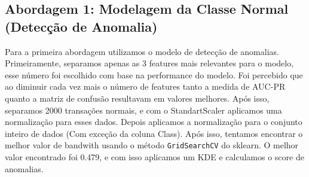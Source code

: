 \documentclass[conference]{IEEEtran}
\begin{document}
\subsection{Abordagem 1: Modelagem da Classe Normal (Detecção de Anomalia)}
\label{subsec:abordagem1}
  Para a primeira abordagem utilizamos o modelo de detecção de anomalias. Primeiramente, separamos apenas as 3 features mais relevantes para o modelo, esse número foi escolhido com base na performance do modelo. Foi percebido que ao diminuir cada vez mais o número de features tanto a medida de AUC-PR quanto a matriz de confusão resultavam em valores melhores. Após isso, separamos 2000 transações normais, e com o StandartScaler aplicamos uma normalização para esses dados. Depois aplicamos a normalização para o conjunto inteiro de dados (Com exceção da coluna Class). Após isso, tentamos encontrar o melhor valor de bandwith usando o método \texttt{GridSearchCV} do sklearn. O melhor valor encontrado foi 0.479, e com isso aplicamos um KDE e calculamos o score de anomalias.
\end{document}
